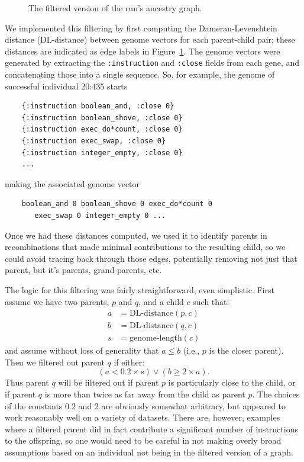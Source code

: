 \begin{figure}[tb!p]
\begin{center}
	\end{center}
	\caption{The filtered version of the run's ancestry graph.}
	\label{fig:run0Filtered}       %
\end{figure}

We implemented this filtering by first computing the Damerau-Levenshtein 
distance (DL-distance)
between genome vectors for each parent-child pair; these distances
are indicated as edge labels in Figure~\ref{fig:run0Filtered}. The genome
vectors were generated by extracting the \texttt{:instruction} and 
\texttt{:close} fields from each gene, and concatenating those into a
single sequence. So, for example, the genome of successful individual
20:435 starts

\begin{verbatim}
	{:instruction boolean_and, :close 0} 
	{:instruction boolean_shove, :close 0} 
	{:instruction exec_do*count, :close 0} 
	{:instruction exec_swap, :close 0} 
	{:instruction integer_empty, :close 0}
	...
\end{verbatim}

making the associated genome vector

\begin{verbatim}
	boolean_and 0 boolean_shove 0 exec_do*count 0 
	   exec_swap 0 integer_empty 0 ...
\end{verbatim}


Once we had these distances computed, we used it to identify parents in
recombinations that made minimal contributions to the resulting child, so
we could avoid tracing back through those edges, potentially removing not
just that parent, but it's parents, grand-parents, etc. 

The logic for this filtering was fairly straightforward, even simplistic.
First assume we have two parents, $p$ and $q$, and a child $c$ such that:
\begin{align*}
	a & = \textrm{DL-distance}(p, c) \\
	b & = \textrm{DL-distance}(q, c) \\
	s & = \textrm{genome-length}(c)
\end{align*}
and assume without loss of generality that $a \leq b$ (i.e., $p$ is the
closer parent). Then we filtered out parent $q$ if either:
\[
	(a < 0.2 \times s) \lor (b \geq 2 \times a).
\]
Thus parent $q$ will be filtered out if parent $p$ is particularly close to
the child, or if parent $q$ is more than twice as far away from the child as
parent $p$. The choices of the constants $0.2$ and $2$ are obviously somewhat
arbitrary, but appeared to work reasonably well on a variety of datasets. 
There are,
however, examples where a filtered parent did in fact contribute a significant
number of instructions to the offspring, so one would need to be careful in not
making overly broad assumptions based on an individual not being in the filtered
version of a graph.

